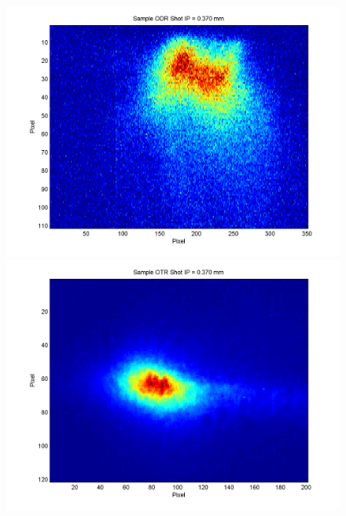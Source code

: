 \documentclass[12pt]{article}
\begin{document}
\begin{figure}
\begin{center}
\includegraphics[scale=0.5]{Figures/Sample_ODR_370.PNG}
\includegraphics[scale=0.5]{Figures/Sample_OTR_370.PNG}
\caption{}
\end{center}
\end{figure}
\end{document}
